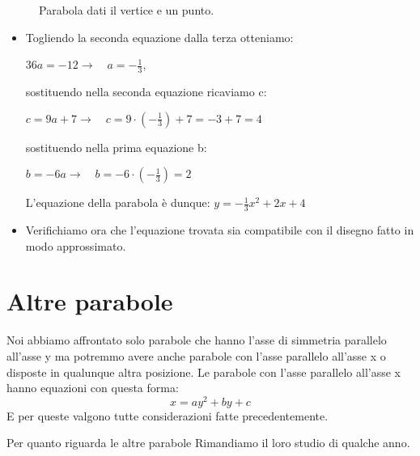 \begin{exrig}
\begin{esempio}
\begin{figure}[h]
\begin{minipage}{.60\textwidth}
\end{minipage}
\begin{minipage}{.40\textwidth}
\begin{inaccessibleblock}[Parabola di equazione $y=x^2$.]
\centering
  
  \caption{Parabola dati il vertice e un punto.} 
\label{fig:parabola_parabolaverticepunto}
\end{inaccessibleblock}
\end{minipage}
\end{figure}

  \begin{itemize}
  \item Togliendo la seconda equazione dalla terza otteniamo: 

$36a=-12 \rightarrow \quad a=-\frac{1}{3}$, 

sostituendo nella seconda equazione ricaviamo c:

$c= 9a+7 \rightarrow \quad c=9 \cdot \left(- \frac{1}{3} \right) +7=-3+7=4$

sostituendo nella prima equazione b:

$b=-6a \rightarrow \quad b=-6 \cdot \left(- \frac{1}{3} \right)=2$

L'equazione della parabola è dunque: $y=-\frac{1}{3}x^2+2x+4$

  \item Verifichiamo ora che l'equazione trovata sia compatibile con il disegno 
  fatto in modo approssimato.
 \end{itemize}
\end{esempio}

\end{exrig}

\section{Altre parabole}
\label{sec:parabola_altreparabole}

Noi abbiamo affrontato solo parabole che hanno l'asse di simmetria parallelo 
all'asse y ma potremmo avere anche parabole con l'asse parallelo all'asse x
o disposte in qualunque altra posizione.
Le parabole con l'asse parallelo all'asse x hanno equazioni con questa forma:
\[x=ay^2+by+c\]
E per queste valgono tutte considerazioni fatte precedentemente.

Per quanto riguarda le altre parabole Rimandiamo il loro studio di qualche 
anno.
